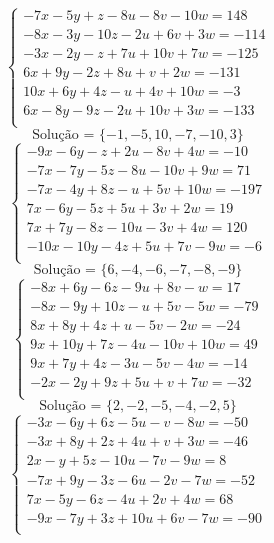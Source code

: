 \documentclass[12pt,oneside,a4paper]{article}
\begin{document}
\vspace{\baselineskip}
\begin{equation*}
\begin{cases}
-7x-5y+z-8u-8v-10w=148 \\
-8x-3y-10z-2u+6v+3w=-114 \\
-3x-2y-z+7u+10v+7w=-125 \\
6x+9y-2z+8u+v+2w=-131 \\
10x+6y+4z-u+4v+10w=-3 \\
6x-8y-9z-2u+10v+3w=-133 \\
\end{cases}
\end{equation*}
\begin{equation*}
\text{Solução = }\{-1,-5,10,-7,-10,3\}
\end{equation*}
\vspace{\baselineskip}
\begin{equation*}
\begin{cases}
-9x-6y-z+2u-8v+4w=-10 \\
-7x-7y-5z-8u-10v+9w=71 \\
-7x-4y+8z-u+5v+10w=-197 \\
7x-6y-5z+5u+3v+2w=19 \\
7x+7y-8z-10u-3v+4w=120 \\
-10x-10y-4z+5u+7v-9w=-6 \\
\end{cases}
\end{equation*}
\begin{equation*}
\text{Solução = }\{6,-4,-6,-7,-8,-9\}
\end{equation*}
\vspace{\baselineskip}
\begin{equation*}
\begin{cases}
-8x+6y-6z-9u+8v-w=17 \\
-8x-9y+10z-u+5v-5w=-79 \\
8x+8y+4z+u-5v-2w=-24 \\
9x+10y+7z-4u-10v+10w=49 \\
9x+7y+4z-3u-5v-4w=-14 \\
-2x-2y+9z+5u+v+7w=-32 \\
\end{cases}
\end{equation*}
\begin{equation*}
\text{Solução = }\{2,-2,-5,-4,-2,5\}
\end{equation*}
\vspace{\baselineskip}
\begin{equation*}
\begin{cases}
-3x-6y+6z-5u-v-8w=-50 \\
-3x+8y+2z+4u+v+3w=-46 \\
2x-y+5z-10u-7v-9w=8 \\
-7x+9y-3z-6u-2v-7w=-52 \\
7x-5y-6z-4u+2v+4w=68 \\
-9x-7y+3z+10u+6v-7w=-90 \\
\end{cases}
\end{equation*}
\end{document}
